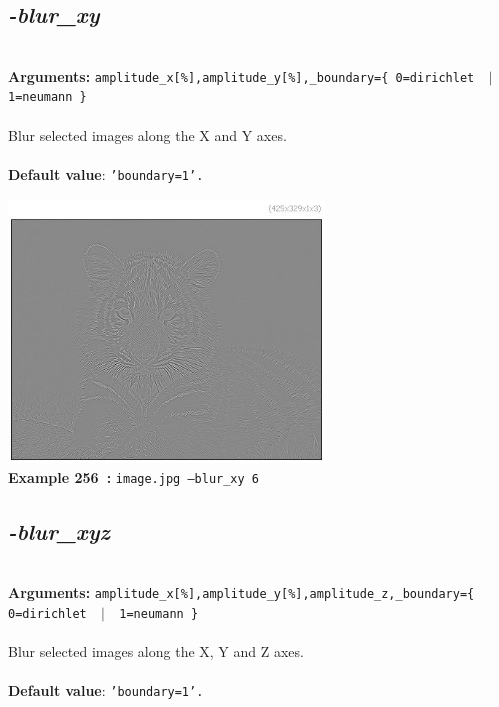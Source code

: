 \documentclass[a4paper,11pt,twoside]{book}
\begin{document}
\subsection{\emph{-blur\_xy} }\vspace*{-0.5em}
~\\\textbf{Arguments: } 
{\small \texttt{amplitude\_x[\%],amplitude\_y[\%],\_boundary=\{ 0=dirichlet ~$|$~ 1=neumann \}}}\\~\\
Blur selected images along the X and Y axes.
~\\~\\\textbf{Default value}: {\small \texttt{'boundary=1'.}}
\begin{center}\includegraphics[keepaspectratio=true,height=7cm,width=\textwidth]{img/gmic_def256.jpg}\\
{\footnotesize \textbf{Example 256~:} \texttt{image.jpg --blur\_xy 6}}
\end{center}

\subsection{\emph{-blur\_xyz} }\vspace*{-0.5em}
~\\\textbf{Arguments: } 
{\small \texttt{amplitude\_x[\%],amplitude\_y[\%],amplitude\_z,\_boundary=\{ 0=dirichlet ~$|$~ 1=neumann \}}}\\~\\
Blur selected images along the X, Y and Z axes.
~\\~\\\textbf{Default value}: {\small \texttt{'boundary=1'.}}
\end{document}
